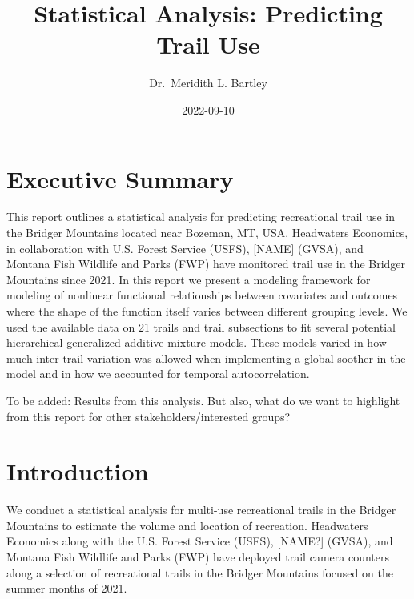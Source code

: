\documentclass[
]{book}
\title{Statistical Analysis: Predicting Trail Use}
\author{Dr.~Meridith L. Bartley}
\date{2022-09-10}
\begin{document}
\maketitle

{
\setcounter{tocdepth}{1}
\tableofcontents
}
\hypertarget{executive-summary}{%
\chapter{Executive Summary}\label{executive-summary}}

This report outlines a statistical analysis for predicting recreational trail use in the Bridger Mountains located near Bozeman, MT, USA. Headwaters Economics, in collaboration with U.S. Forest Service (USFS), {[}NAME{]} (GVSA), and Montana Fish Wildlife and Parks (FWP) have monitored trail use in the Bridger Mountains since 2021. In this report we present a modeling framework for modeling of nonlinear functional relationships between covariates and outcomes where the shape of the function itself varies between different grouping levels. We used the available data on 21 trails and trail subsections to fit several potential hierarchical generalized additive mixture models. These models varied in how much inter-trail variation was allowed when implementing a global soother in the model and in how we accounted for temporal autocorrelation.

To be added: Results from this analysis. But also, what do we want to highlight from this report for other stakeholders/interested groups?

\hypertarget{introduction}{%
\chapter{Introduction}\label{introduction}}

We conduct a statistical analysis for multi-use recreational trails in the Bridger Mountains to estimate the volume and location of recreation. Headwaters Economics along with the U.S. Forest Service (USFS), {[}NAME?{]} (GVSA), and Montana Fish Wildlife and Parks (FWP) have deployed trail camera counters along a selection of recreational trails in the Bridger Mountains focused on the summer months of 2021.
\end{document}
